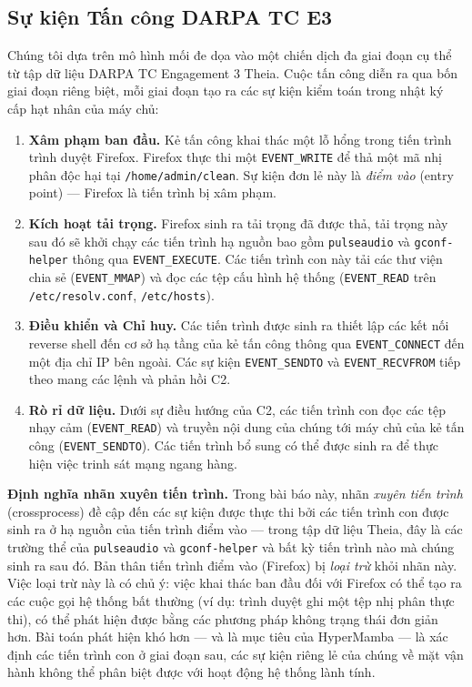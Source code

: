 \documentclass[letterpaper,twocolumn,10pt]{article}
\begin{document}
\subsection{Sự kiện Tấn công DARPA TC E3}
\label{sec:attack_instantiation}

Chúng tôi dựa trên mô hình mối đe dọa vào một chiến dịch đa giai đoạn cụ thể từ tập dữ liệu DARPA TC Engagement 3 Theia. Cuộc tấn công diễn ra qua bốn giai đoạn riêng biệt, mỗi giai đoạn tạo ra các sự kiện kiểm toán trong nhật ký cấp hạt nhân của máy chủ:

\begin{enumerate}
    \item \textbf{Xâm phạm ban đầu.} Kẻ tấn công khai thác một lỗ hổng trong tiến trình trình duyệt Firefox. Firefox thực thi một \texttt{EVENT\_WRITE} để thả một mã nhị phân độc hại tại \texttt{/home/admin/clean}. Sự kiện đơn lẻ này là \emph{điểm vào} (entry point) --- Firefox là tiến trình bị xâm phạm.

    \item \textbf{Kích hoạt tải trọng.} Firefox sinh ra tải trọng đã được thả, tải trọng này sau đó sẽ khởi chạy các tiến trình hạ nguồn bao gồm \texttt{pulseaudio} và \texttt{gconf-helper} thông qua \texttt{EVENT\_EXECUTE}. Các tiến trình con này tải các thư viện chia sẻ (\texttt{EVENT\_MMAP}) và đọc các tệp cấu hình hệ thống (\texttt{EVENT\_READ} trên \texttt{/etc/resolv.conf}, \texttt{/etc/hosts}).

    \item \textbf{Điều khiển và Chỉ huy.} Các tiến trình được sinh ra thiết lập các kết nối reverse shell đến cơ sở hạ tầng của kẻ tấn công thông qua \texttt{EVENT\_CONNECT} đến một địa chỉ IP bên ngoài. Các sự kiện \texttt{EVENT\_SENDTO} và \texttt{EVENT\_RECVFROM} tiếp theo mang các lệnh và phản hồi C2.

    \item \textbf{Rò rỉ dữ liệu.} Dưới sự điều hướng của C2, các tiến trình con đọc các tệp nhạy cảm (\texttt{EVENT\_READ}) và truyền nội dung của chúng tới máy chủ của kẻ tấn công (\texttt{EVENT\_SENDTO}). Các tiến trình bổ sung có thể được sinh ra để thực hiện việc trinh sát mạng ngang hàng.
\end{enumerate}

\textbf{Định nghĩa nhãn xuyên tiến trình.} Trong bài báo này, nhãn \emph{xuyên tiến trình} (crossprocess) đề cập đến các sự kiện được thực thi bởi các tiến trình con được sinh ra ở hạ nguồn của tiến trình điểm vào --- trong tập dữ liệu Theia, đây là các trường thể của \texttt{pulseaudio} và \texttt{gconf-helper} và bất kỳ tiến trình nào mà chúng sinh ra sau đó. Bản thân tiến trình điểm vào (Firefox) bị \emph{loại trừ} khỏi nhãn này. Việc loại trừ này là có chủ ý: việc khai thác ban đầu đối với Firefox có thể tạo ra các cuộc gọi hệ thống bất thường (ví dụ: trình duyệt ghi một tệp nhị phân thực thi), có thể phát hiện được bằng các phương pháp không trạng thái đơn giản hơn. Bài toán phát hiện khó hơn --- và là mục tiêu của HyperMamba --- là xác định các tiến trình con ở giai đoạn sau, các sự kiện riêng lẻ của chúng về mặt vận hành không thể phân biệt được với hoạt động hệ thống lành tính.
\end{document}
